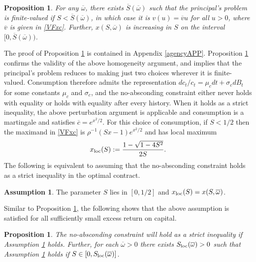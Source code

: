 \documentclass[11pt]{article}
\theoremstyle{plain}
\newtheorem{prop}[thm]{Proposition}
\theoremstyle{definition} %
\newtheorem{assump}{Assumption}[section]
\begin{document}
\begin{prop} \label{existence}
For any $\overline{\omega}$, there exists $\overline{S}(\overline{\omega})$ such that the principal's problem is finite-valued if $S < \overline{S}(\overline{\omega})$, in which case it is $v(u) = \overline{v}u$ for all $u > 0$, where $\overline{v}$ is given in \eqref{VFxc}. Further, $x(S,\overline{\omega})$ is increasing in $S$ on the interval $[0, \overline{S}(\overline{\omega}))$. 
\end{prop}

The proof of Proposition \ref{existence} is contained in Appendix \ref{agencyAPP}. Proposition \ref{existence} confirms the validity of the above homogeneity argument, and implies that the principal's problem reduces to making just two choices wherever it is finite-valued. Consumption therefore admits the representation $dc_t/c_t = \mu_cdt + \sigma_cdB_t$ for some constants $\mu_c$ and $\sigma_c$, and the no-absconding constraint either never holds with equality or holds with equality after every history. When it holds as a strict inequality, the above perturbation argument is applicable and consumption is a martingale and satisfies $\overline{c} = e^{x^2/2}$. For this choice of consumption, if $S < 1/2$ then the maximand in \eqref{VFxc} is $\rho^{-1}(Sx-1)e^{x^2/2}$ and has local maximum
\begin{equation}
x_{\textnormal{loc}}(S) := \frac{1 - \sqrt{1 - 4S^2}}{2S}.
\label{kcx}
\end{equation}
The following is equivalent to assuming that the no-absconding constraint holds as a strict inequality in the optimal contract. 

\begin{assump} \label{locfeas}%
The parameter $S$ lies in $[0, 1/2]$ and $x_{\textnormal{loc}}(S) = x(S,\overline{\omega})$. 
\end{assump}

Similar to Proposition \ref{existence}, the following shows that the above assumption is satisfied for all sufficiently small excess return on capital. 

\begin{prop}\label{suffLEM} 
The no-absconding constraint will hold as a strict inequality if Assumption \ref{locfeas} holds. Further, for each $\overline{\omega} > 0$ there exists $S_{\textnormal{loc}}(\overline{\omega}) > 0$ such that Assumption \ref{locfeas} holds if $S \in [0, S_{\textnormal{loc}}(\overline{\omega})]$. 
\end{prop} 
\end{document}
